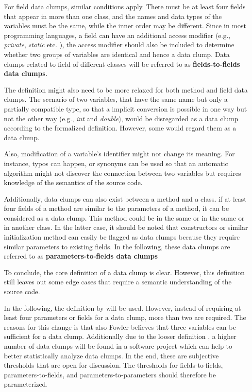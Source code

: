For field data clumps, similar conditions apply. There must be at least four fields that appear in more than one class, and the names and data types of the variables must be the same, while the inner order may be different. Since in most programming languages, a field can have an additional access modifier (e.g., \textit{private}, \textit{static} etc. ), the access modifier should also be included to determine whether two groups of variables are identical and hence a data clump.  Data clumps related to field of different classes will be referred to as \textbf{fields-to-fields data clumps}. 

The definition might also need to be more relaxed for both method and field data clumps. The scenario of two variables, that have the same name but only a partially compatible type, so that a implicit conversion is possible in one way but not the other way (e.g., \textit{int} and  \textit{double}), would be disregarded as a data clump according to the formalized definition. However, some would regard them as a data clump.

Also, modification of a variable's identifier might not change its meaning. For instance, typos can happen, or synonyms can be used so that an automatic algorithm might not discover the connection between two variables but requires knowledge of the semantics of the source code. \cite{zhangImprovingPrecisionFowler2008}

Additionally, data clumps can also exist between a method and a class. if at least four fields of a method are similar to the parameters of a method, it can be considered as a data clump. This method could be in the same or in the same or in another class. In the latter case, it should be noted that constructors or similar initialization method can easily be flagged as data clumps because they require similar parameters to existing fields. In the following, these data clumps are referred to as \textbf{parameters-to-fields data clumps}


To conclude, the core definition of a data clump is clear. However, this definition still leaves out some edge cases that require a semantic understanding of the source code. 



In the following, the definition by \cite{zhangImprovingPrecisionFowler2008} will be used. However,  instead of requiring at least four parameters or fields for a data clump, more than two are required. The reasons for this change is that also Fowler believes that three variables can be sufficient for a data clump. Additionally due to the looser definition , a higher number of data clumps will be found in a software project which can help to better statistically analyze data clumps. In the end, these are subjective thresholds that are open for discussion. The thresholds for fields-to-fields, parameters-to-fields, and parameters-to-parameters should therefore be parameterized.

